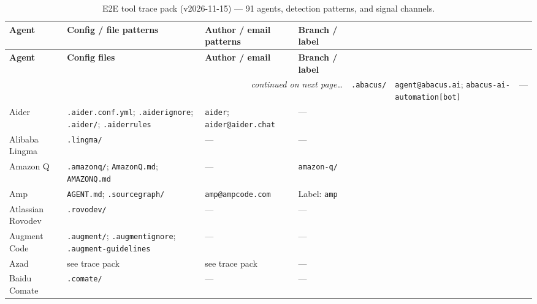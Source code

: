 \begin{small}
\begin{longtable}{@{}p{2.8cm}p{3.8cm}p{4.8cm}p{3.1cm}@{}}
\caption[E2E tool trace pack agent signal catalogue]{E2E tool trace pack (v2026-11-15) --- 91 agents, detection patterns, and signal channels.}
\label{tab:e2e-agents}\\
\toprule
\textbf{Agent} & \textbf{Config / file patterns} & \textbf{Author / email patterns} & \textbf{Branch / label} \\
\midrule\endfirsthead
\toprule\textbf{Agent} & \textbf{Config files} & \textbf{Author / email} & \textbf{Branch / label}\\\midrule\endhead
\midrule\multicolumn{4}{r}{\footnotesize\textit{continued on next page\ldots}}\endfoot
\bottomrule\endlastfoot

Abacus AI       & \texttt{.abacus/}                             & \texttt{agent@abacus.ai}; \texttt{abacus-ai-automation[bot]}               & --- \\
Aider           & \texttt{.aider.conf.yml}; \texttt{.aiderignore}; \texttt{.aider/}; \texttt{.aiderrules} & \texttt{aider}; \texttt{aider@aider.chat}  & --- \\
Alibaba Lingma  & \texttt{.lingma/}                             & ---                                                                         & --- \\
Amazon Q        & \texttt{.amazonq/}; \texttt{AmazonQ.md}; \texttt{AMAZONQ.md} & ---                                                        & \texttt{amazon-q/} \\
Amp             & \texttt{AGENT.md}; \texttt{.sourcegraph/}     & \texttt{amp@ampcode.com}                                                   & Label: \texttt{amp} \\
Atlassian Rovodev & \texttt{.rovodev/}                          & ---                                                                         & --- \\
Augment Code    & \texttt{.augment/}; \texttt{.augmentignore}; \texttt{.augment-guidelines} & ---                                        & --- \\
Azad            & see trace pack                                & see trace pack                                                              & --- \\
Baidu Comate    & \texttt{.comate/}                             & ---                                                                         & --- \\

\end{longtable}
\end{small}
